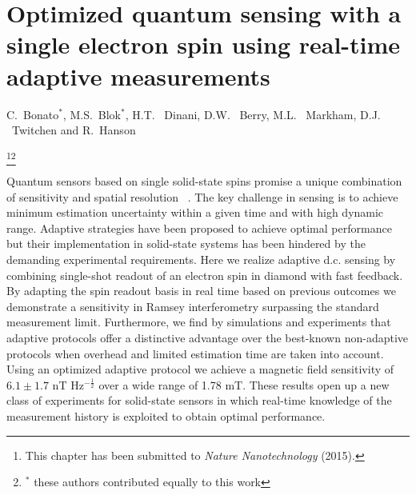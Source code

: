 

\graphicspath{{./ch_adptv_msmnt_magnetometry/figures/}}


\chapter[Optimized quantum sensing using real-time adaptive measurements]{ Optimized quantum sensing with a single electron spin using real-time adaptive measurements}
\label{ch:AMM}

\begin{center} 
    \vspace{-1cm} {C.~Bonato$^*$, M.S.~Blok$^*$, H.T. ~Dinani, D.W. ~Berry, M.L. ~Markham, D.J. ~Twitchen  and R.~Hanson} 
\end{center}

{\renewcommand{\thefootnote}{}\footnote{This chapter has been submitted to
    {\em Nature Nanotechnology} (2015).}\footnote{$^*$ these authors contributed equally to this work}}

\vspace{-0.5cm} 
Quantum sensors based on single solid-state spins promise a unique combination of sensitivity and spatial resolution ~\cite{Giovannetti_NatPhoton_2011,Higgins_Nature_2007,Degen_APL_2008,Taylor_NatPhys_2008,Maze_Nature_2008,Balasubramanian_Nature_2008,Balasubramanian_NatMater_2009,Dolde_NatPhys_2011,Acosta_Phys.Rev.Lett._2010,Toyli_PNAS_2013,Ovartchaiyapong_NatCommun_2014,LeSage_Nature_2013,Kaufmann_PNAS_2013,Kucsko_Nature_2013,Shi_Science_2015,Maletinsky_NatNano_2012,Staudacher_Science_2013,Mamin_Science_2013,Tetienne_Science_2014,Kolkowitz_Science_2015}. The key challenge in sensing is to achieve minimum estimation uncertainty within a given time and with high dynamic range. Adaptive strategies have been proposed to achieve optimal performance but their implementation in solid-state systems has been hindered by the demanding experimental requirements. Here we realize adaptive d.c. sensing by combining single-shot readout of an electron spin in diamond with fast feedback. By adapting the spin readout basis in real time based on previous outcomes we demonstrate a sensitivity in Ramsey interferometry surpassing the standard measurement limit. Furthermore, we find by simulations and experiments that adaptive protocols offer a distinctive advantage over the best-known non-adaptive protocols when overhead and limited estimation time are taken into account. Using an optimized adaptive protocol we achieve a magnetic field sensitivity of $6.1\pm 1.7$ nT Hz$^{-\frac{1}{2}}$ over a wide range of 1.78 mT. These results open up a new class of experiments for solid-state sensors in which real-time knowledge of the measurement history is exploited to obtain optimal performance.



